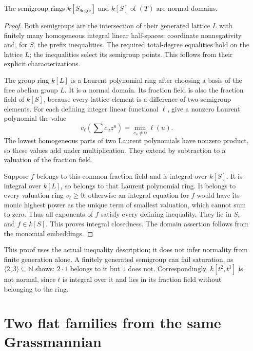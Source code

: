 \begin{proposition}
The semigroup rings
\(k[S_{\mathrm{Segre}}]\)
and \(k[S]\) of \((T)\)
are normal domains.
\end{proposition}
\begin{proof}
Both semigroups are
the intersection of
their generated lattice
\(L\) with finitely
many homogeneous
integral linear
half-spaces: coordinate
nonnegativity and,
for \(S\), the prefix
inequalities.  The
required total-degree
equalities hold on
the lattice \(L\);
the inequalities
select its
semigroup points.
This follows from
their explicit
characterizations.

The group ring \(k[L]\)
is a Laurent
polynomial ring
after choosing a
basis of the free
abelian group \(L\).
It is a normal
domain.  Its
fraction field is
also the fraction
field of \(k[S]\),
because every lattice
element is a
difference of two
semigroup elements.
For each defining
integer linear
functional \(\ell\),
give a nonzero
Laurent polynomial
the value
\[
 v_\ell\left(\sum c_u z^u\right)
       =\min_{c_u\ne0}\ell(u).
 \]
The lowest homogeneous
parts of two Laurent
polynomials have
nonzero product, so
these values add
under multiplication.
They extend by
subtraction to a
valuation of the
fraction field.

Suppose \(f\) belongs
to this common
fraction field and
is integral over \(k[S]\).
It is integral over
\(k[L]\), so belongs
to that Laurent
polynomial ring.
It belongs to
every valuation
ring \(v_\ell\ge0\):
otherwise an integral
equation for \(f\)
would have its
monic highest power
as the unique term
of smallest valuation,
which cannot sum
to zero.  Thus all
exponents of \(f\)
satisfy every
defining inequality.
They lie in \(S\),
and \(f\in k[S]\).
This proves integral
closedness.  The
domain assertion
follows from the
monomial embeddings.
\end{proof}

This proof uses the
actual inequality
description; it
does not infer
normality from
finite generation
alone.  A finitely
generated semigroup
can fail saturation,
as \(\langle2,3\rangle
\subseteq\mathbb N\)
shows: \(2\cdot1\)
belongs to it but
\(1\) does not.
Correspondingly,
\(k[t^2,t^3]\) is
not normal, since
\(t\) is integral
over it and lies
in its fraction
field without
belonging to the
ring.

\section{Two flat families from the same Grassmannian}

